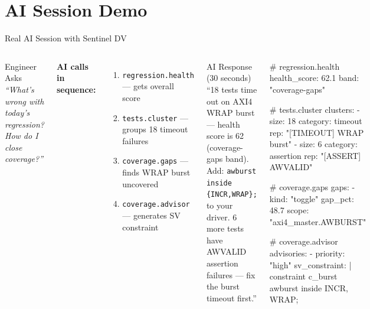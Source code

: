 \documentclass[aspectratio=169,t]{beamer}
\begin{document}
\section{AI Session Demo}
\begin{frame}[fragile]{Real AI Session with Sentinel DV}
  \begin{columns}[T]
      \begin{block}{Engineer Asks}
        \large\textit{``What's wrong with today's regression?\\
        How do I close coverage?''}
      \end{block}
      \vspace{0.3em}
      \small
      \textbf{AI calls in sequence:}
      \begin{enumerate}
        \item \texttt{regression.health} — gets overall score
        \item \texttt{tests.cluster} — groups 18 timeout failures
        \item \texttt{coverage.gaps} — finds WRAP burst uncovered
        \item \texttt{coverage.advisor} — generates SV constraint
      \end{enumerate}
      \vspace{0.3em}
      \begin{alertblock}{AI Response (30 seconds)}
        \small
        ``18 tests time out on AXI4 WRAP burst — health
        score is 62 (coverage-gaps band). Add:
        \texttt{awburst inside \{INCR,WRAP\};} to your
        driver. 6 more tests have AWVALID assertion
        failures — fix the burst timeout first.''
      \end{alertblock}

\begin{semiverbatim}\color{white}
# regression.health
health_score: 62.1
band: "coverage-gaps"

# tests.cluster
clusters:
  - size: 18
    category: timeout
    rep: "[TIMEOUT] WRAP burst"
  - size: 6
    category: assertion
    rep: "[ASSERT] AWVALID"

# coverage.gaps
gaps:
  - kind: "toggle"
    gap_pct: 48.7
    scope: "axi4_master.AWBURST"

# coverage.advisor
advisories:
  - priority: "high"
    sv_constraint: |
      constraint c_burst {
        awburst inside
          {INCR, WRAP};
      }
\end{semiverbatim}
  \end{columns}
\end{frame}
\end{document}
